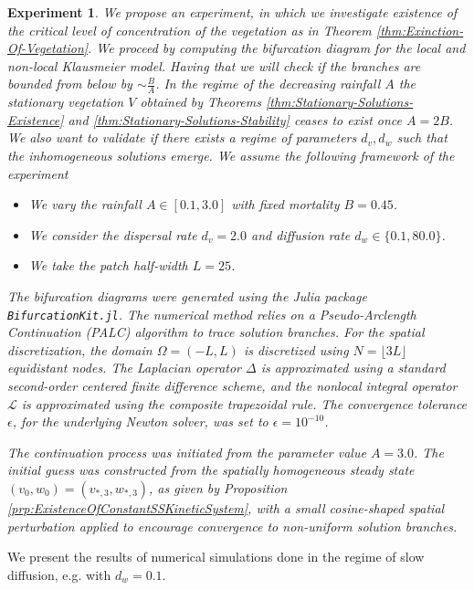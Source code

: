 \documentclass[11pt, a4paper]{article}
\theoremstyle{break}
\theoremstyle{break}
\theoremstyle{break}
\theoremstyle{break}
\theoremstyle{break}
\theoremstyle{break}
\theoremstyle{break}
\theoremstyle{break}
\newtheorem{expe}{Experiment}[section]
\theoremstyle{break}
\begin{document}
\begin{expe}
    We propose an experiment, in which we investigate existence of the critical level of concentration of the vegetation as in Theorem \ref{thm:Exinction-Of-Vegetation}. We proceed by computing the bifurcation diagram for the local and non-local Klausmeier model. Having that we will check if the branches are bounded from below by $\sim\frac{B}{A}$. In the regime of the decreasing rainfall $A$ the stationary vegetation $V$ obtained by Theorems \ref{thm:Stationary-Solutions-Existence} and \ref{thm:Stationary-Solutions-Stability} ceases to exist once $A = 2B$. We also want to validate if there exists a regime of parameters $d_v, d_w$ such that the inhomogeneous solutions emerge. We assume the following framework of the experiment
    \begin{itemize}
        \item We vary the rainfall $A \in [0.1, 3.0]$ with fixed mortality $B = 0.45$.
        \item We consider the dispersal rate $d_v = 2.0$ and diffusion rate $d_w \in \{0.1, 80.0\}$.
        \item We take the patch half-width $L = 25$.
    \end{itemize}
    The bifurcation diagrams were generated using the Julia package \texttt{BifurcationKit.jl}. The numerical method relies on a Pseudo-Arclength Continuation (PALC) algorithm to trace solution branches. For the spatial discretization, the domain $\Omega = (-L, L)$ is discretized using $N = \lfloor 3L \rfloor$ equidistant nodes. The Laplacian operator $\Delta$ is approximated using a standard second-order centered finite difference scheme, and the nonlocal integral operator $\mathcal{L}$ is approximated using the composite trapezoidal rule. The convergence tolerance $\epsilon$, for the underlying Newton solver, was set to $\epsilon = 10^{-10}$.

    The continuation process was initiated from the parameter value $A = 3.0$. The initial guess was constructed from the spatially homogeneous steady state $(v_0, w_0) = (v_{*, 3}, w_{*, 3})$, as given by Proposition \ref{prp:ExistenceOfConstantSSKineticSystem}, with a small cosine-shaped spatial perturbation applied to encourage convergence to non-uniform solution branches.
\end{expe}

We present the results of numerical simulations done in the regime of slow diffusion, e.g. with $d_w = 0.1$.
\end{document}
